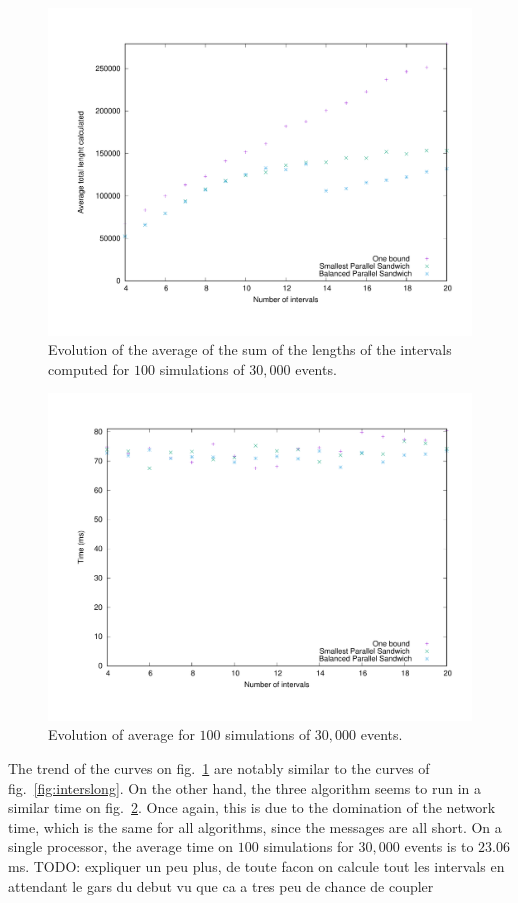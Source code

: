 \documentclass[a4paper,10pt]{article}
\newcommand{\todo}[1]{{\color{red} TODO: {#1}}}
\begin{document}
\begin{figure}[H]
\centering
\label{fig:intersshort}
 \includegraphics[scale=0.45]{intersshort.pdf}
 \caption{Evolution of the average of the sum of the lengths of the intervals computed for $100$ simulations of $30,000$ events.}
\end{figure}

\begin{figure}[H]
\centering
\label{fig:timeshort}
 \includegraphics[scale=0.45]{timeshort.pdf}
 \caption{Evolution of average for $100$ simulations of $30,000$ events.}
\end{figure}

The trend of the curves on fig.~\ref{fig:intersshort} are notably similar to the curves of fig.~\ref{fig:interslong}. 
On the other hand, the three algorithm seems to run in a similar time on fig.~\ref{fig:timeshort}. Once again, this is due to the domination of the network time, which is the same for all algorithms, since the messages are all short.
On a single processor, the average time on $100$ simulations for $30,000$ events is to $23.06$ ms.
\todo{expliquer un peu plus, de toute facon on calcule tout les intervals en attendant le gars du debut vu que ca a tres peu de chance de coupler}
\end{document}
